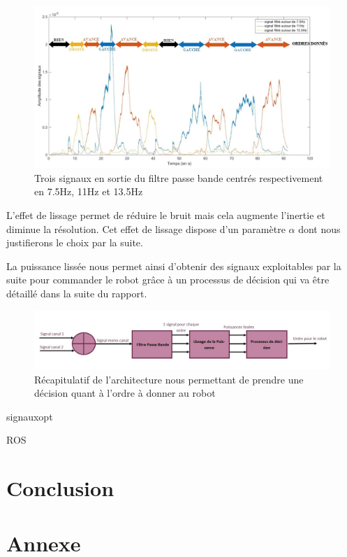 \documentclass[11pt]{article}
\begin{document}
\begin{figure}[!h]
	\includegraphics[scale=0.75]{images/puissancelissee.jpg}
	\caption{Trois signaux en sortie du filtre passe bande centrés respectivement en 7.5Hz, 11Hz et 13.5Hz}
	\label{fig:duck}
\end{figure}

L'effet de lissage permet de réduire le bruit mais cela augmente l'inertie et diminue la résolution. Cet effet de lissage dispose d'un paramètre $ \alpha $ dont nous justifierons le choix par la suite.

La puissance lissée nous permet ainsi d'obtenir des signaux exploitables par la suite pour commander le robot grâce à un processus de décision qui va être détaillé dans la suite du rapport.

\begin{figure}[!h]
	\includegraphics[scale=0.75]{images/diagramme.jpg}
	\caption{Récapitulatif de l'architecture nous permettant de prendre une décision quant à l'ordre à donner au robot}
	\label{fig:duck}
\end{figure}





\cleardoublepage


{signauxopt}

\cleardoublepage


{ROS}

\section{Conclusion}
\cleardoublepage



\section{Annexe}


\cleardoublepage
\end{document}
